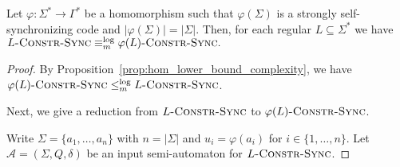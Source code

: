 \begin{theoremrep}
\label{thm:constr_sync_hom_strongly_self_sync}
 Let $\varphi : \Sigma^* \to \Gamma^*$
 be a homomorphism such that $\varphi(\Sigma)$
 is a strongly self-synchronizing code and $|\varphi(\Sigma)| = |\Sigma|$.
 Then, for each regular $L \subseteq \Sigma^*$ we have
 $
  L\textsc{-Constr-Sync} \equiv_m^{\log} \varphi(L)\textsc{-Constr-Sync}.
 $
\end{theoremrep}
\begin{proof}
 By Proposition~\ref{prop:hom_lower_bound_complexity}, we have 
 $\varphi(L)\textsc{-Constr-Sync} \le_m^{\log} L\textsc{-Constr-Sync}$.
 
 
 Next, we give a reduction 
 from $L\textsc{-Constr-Sync}$ %
 to $\varphi(L)\textsc{-Constr-Sync}$.
 
 Write $\Sigma = \{a_1, \ldots, a_n\}$ with $n = |\Sigma|$
 and $u_i = \varphi(a_i)$ for $i \in \{1,\ldots,n\}$.
 Let $\mathcal A = (\Sigma, Q, \delta)$
 be an input semi-automaton for $L\textsc{-Constr-Sync}$.
 

\end{proof}
